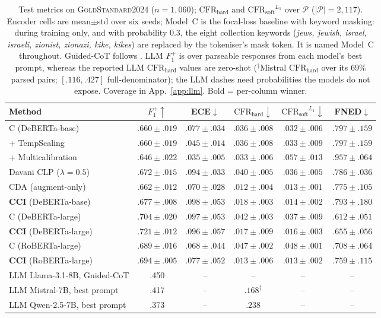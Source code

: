 \documentclass[11pt]{article}
\newcommand{\dataset}{\textsc{GoldStandard2024}\xspace}
\newcommand{\Fpos}{\ensuremath{F_1^{+}}\xspace}
\newcommand{\CFRh}{\ensuremath{\mathrm{CFR}_{\mathrm{hard}}}\xspace}
\newcommand{\CFRs}{\ensuremath{\mathrm{CFR}_{\mathrm{soft}}}\xspace}
\begin{document}
\begin{table}[t]
\centering
\small
\setlength{\tabcolsep}{3pt}
\begin{tabular}{lccccc}
\toprule
Method & $\Fpos\uparrow$ & ECE$\downarrow$ & $\CFRh\downarrow$ & $\CFRs^{L_1}\downarrow$ & FNED$\downarrow$ \\
\midrule
C (DeBERTa-base)                   & $.660{\pm}.019$ & $.077{\pm}.034$ & $.036{\pm}.008$ & $.032{\pm}.006$ & $.797{\pm}.159$ \\
\;\;+ TempScaling                  & $.660{\pm}.019$ & $.045{\pm}.014$ & $.036{\pm}.008$ & $.033{\pm}.009$ & $.797{\pm}.159$ \\
\;\;+ Multicalibration             & $.646{\pm}.022$ & $\mathbf{.035}{\pm}.005$ & $.033{\pm}.006$ & $.057{\pm}.013$ & $.957{\pm}.064$ \\
Davani CLP ($\lambda{=}0.5$)       & $.672{\pm}.015$ & $.094{\pm}.033$ & $.040{\pm}.005$ & $.036{\pm}.005$ & $.786{\pm}.036$ \\
CDA (augment-only)                 & $.662{\pm}.012$ & $.070{\pm}.028$ & $\mathbf{.012}{\pm}.004$ & $\mathbf{.013}{\pm}.001$ & $.775{\pm}.105$ \\
\textbf{CCI} (DeBERTa-base)     & $.677{\pm}.008$ & $.098{\pm}.053$ & $.018{\pm}.003$ & $.014{\pm}.002$ & $.793{\pm}.180$ \\
\midrule
C (DeBERTa-large)                  & $.704{\pm}.020$ & $.097{\pm}.053$ & $.042{\pm}.003$ & $.037{\pm}.009$ & $\mathbf{.612}{\pm}.051$ \\
\textbf{CCI} (DeBERTa-large)    & $\mathbf{.721}{\pm}.012$ & $.096{\pm}.057$ & $.017{\pm}.009$ & $.016{\pm}.003$ & $.655{\pm}.056$ \\
C (RoBERTa-large)                  & $.689{\pm}.016$ & $.068{\pm}.044$ & $.047{\pm}.002$ & $.048{\pm}.001$ & $.708{\pm}.064$ \\
\textbf{CCI} (RoBERTa-large)    & $.694{\pm}.005$ & $.077{\pm}.052$ & $.013{\pm}.006$ & $\mathbf{.013}{\pm}.002$ & $.759{\pm}.115$ \\
\midrule
LLM Llama-3.1-8B, Guided-CoT       & .450 & --   & --               & --   & --   \\
LLM Mistral-7B, best prompt        & .417 & --   & $.168^{\dagger}$ & --   & --   \\
LLM Qwen-2.5-7B, best prompt       & .373 & --   & $.238$           & --   & --   \\
\bottomrule
\end{tabular}
\caption{Test metrics on \dataset{} ($n{=}1{,}060$); $\CFRh$ and $\CFRs^{L_1}$ over $\mathcal{P}$ ($|\mathcal{P}|{=}2{,}117$). Encoder cells are mean$\pm$std over six seeds; Model~C is the focal-loss baseline with keyword masking: during training only, and with probability $0.3$, the eight collection keywords (\emph{jews, jewish, israel, israeli, zionist, zionazi, kike, kikes}) are replaced by the tokeniser's mask token. It is named Model~C throughout. Guided-CoT follows \citet{patel2025evaluating}. LLM \Fpos{} is over parseable responses from each model's best prompt, whereas the reported LLM \CFRh{} values are zero-shot ($^{\dagger}$Mistral \CFRh{} over its $69\%$ parsed pairs; $[.116,.427]$ full-denominator); the LLM dashes need probabilities the models do not expose. Coverage in App.~\ref{app:llm}. Bold = per-column winner.}

\end{table}
\end{document}
